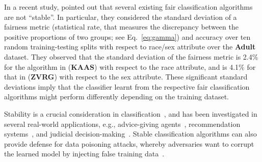 \documentclass[11pt]{article}
\begin{document}
	In a recent study, \cite{friedler2018comparative} pointed out  that several existing fair classification algorithms are not ``stable''.
	In particular, they considered the standard deviation of a fairness metric (statistical rate, that measures the discrepancy between the positive proportions of two groups; see Eq.~\eqref{eq:gamma}) and accuracy over ten random training-testing splits with respect to race/sex attribute over the \textbf{Adult} dataset.
	They observed that the standard deviation of the fairness metric is 2.4$\%$ for the algorithm in \cite{kamishima2012fairness} (\textbf{KAAS}) with respect to the race attribute, and is 4.1$\%$ for that in \cite{zafar2017fairness} (\textbf{ZVRG}) with respect to the sex attribute.
	These significant standard deviations imply that the classifier learnt from the respective fair classification algorithms might perform differently depending on the training dataset.
	
	
	Stability is a crucial consideration in  classification~\cite{bousquet2002stability,mukherjee2006learning,briand2009similarity,fawzi2018analysis}, and has been investigated in several real-world applications, e.g., advice-giving agents~\cite{gershoff2003consumer,van2005factors}, recommendation systems~\cite{adomavicius2012stability,adomavicius2011maximizing,adomavicius2016classification}, and judicial decision-making~\cite{shapiro1965stability}. 
	Stable classification algorithms can also provide defense for data poisoning attacks, whereby adversaries want to corrupt the learned model by injecting false training data~\cite{biggio2012poisoning,mei2015using,steinhardt2017certified}.
	
\end{document}
